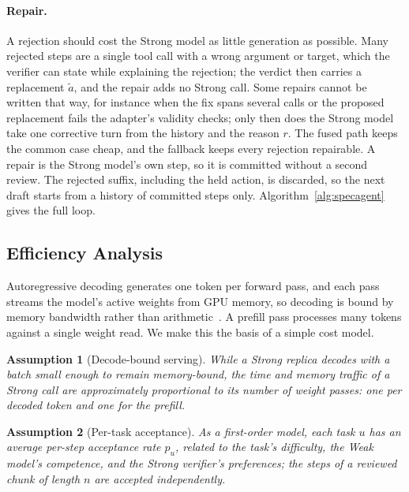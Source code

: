 \documentclass[11pt, copyright, logo, secondlogo]{template/lark}
\newtheorem{assumption}{Assumption}
\begin{document}
\paragraph{Repair.}
A rejection should cost the Strong model as little generation as possible.
Many rejected steps are a single tool call with a wrong argument or target,
which the verifier can state while explaining the rejection; the verdict then
carries a replacement $\tilde a$, and the repair adds no Strong call. Some
repairs cannot be written that way, for instance when the fix spans several
calls or the proposed replacement fails the adapter's validity checks; only
then does the Strong model take one corrective turn from the history and the
reason $r$. The fused path keeps the common case cheap, and the fallback keeps
every rejection repairable. A repair is the Strong model's own step, so it is
committed without a second review. The rejected suffix, including the held
action, is discarded, so the next draft starts from a history of committed
steps only. Algorithm~\ref{alg:specagent} gives the full loop.


\subsection{Efficiency Analysis}
\label{sec:method_cost}

Autoregressive decoding generates one token per forward pass, and each pass
streams the model's active weights from GPU memory, so decoding is bound by
memory bandwidth rather than arithmetic~\citep{pope2023efficiently}. A
prefill pass processes many tokens against a single weight read. We make this
the basis of a simple cost model.

\begin{assumption}[Decode-bound serving]
\label{ass:decode_bound}
While a Strong replica decodes with a batch small enough to remain
memory-bound, the time and memory traffic of a Strong call are approximately
proportional to its number of weight passes: one per decoded token and one
for the prefill.
\end{assumption}

\begin{assumption}[Per-task acceptance]
\label{ass:acceptance}
As a first-order model, each task $u$ has an average per-step acceptance rate
$p_u$, related to the task's difficulty, the Weak model's competence, and the
Strong verifier's preferences; the steps of a reviewed chunk of length $n$ are
accepted independently.
\end{assumption}
\end{document}
